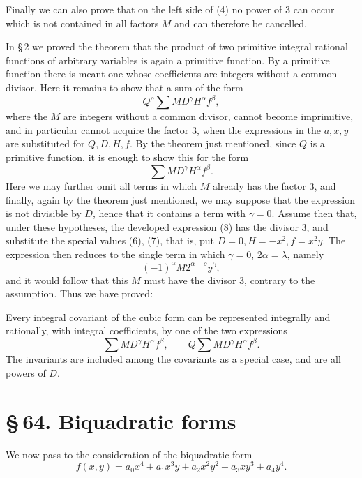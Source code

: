 \documentclass[11pt]{article}
\newcommand{\sect}[2]{\section*{\S\,#1. #2}}
\begin{document}
Finally we can also prove that on the left side of (4) no power of $3$ can occur which is not contained in all factors $M$ and can therefore be cancelled.

In \S\,2 we proved the theorem that the product of two primitive integral rational functions of arbitrary variables is again a primitive function. By a primitive function there is meant one whose coefficients are integers without a common divisor. Here it remains to show that a sum of the form
\[
 Q^\rho\sum MD^\gamma H^\alpha f^\beta,
\]
where the $M$ are integers without a common divisor, cannot become imprimitive, and in particular cannot acquire the factor $3$, when the expressions in the $a,x,y$ are substituted for $Q,D,H,f$. By the theorem just mentioned, since $Q$ is a primitive function, it is enough to show this for the form
\begin{equation}
 \sum MD^\gamma H^\alpha f^\beta.
\tag{8}
\end{equation}
Here we may further omit all terms in which $M$ already has the factor $3$, and finally, again by the theorem just mentioned, we may suppose that the expression is not divisible by $D$, hence that it contains a term with $\gamma=0$. Assume then that, under these hypotheses, the developed expression (8) has the divisor $3$, and substitute the special values (6), (7), that is, put $D=0,H=-x^2,f=x^2y$. The expression then reduces to the single term in which $\gamma=0$, $2\alpha=\lambda$, namely
\[
 (-1)^\alpha M2^{\alpha+\rho}y^\beta,
\]
and it would follow that this $M$ must have the divisor $3$, contrary to the assumption. Thus we have proved:

Every integral covariant of the cubic form can be represented integrally and rationally, with integral coefficients, by one of the two expressions
\[
 \sum MD^\gamma H^\alpha f^\beta,
 \qquad
 Q\sum MD^\gamma H^\alpha f^\beta.
\]
The invariants are included among the covariants as a special case, and are all powers of $D$.

\sect{64}{Biquadratic forms}

We now pass to the consideration of the biquadratic form
\begin{equation}
 f(x,y)=a_0x^4+a_1x^3y+a_2x^2y^2+a_3xy^3+a_4y^4.
\tag{1}
\end{equation}
\end{document}
